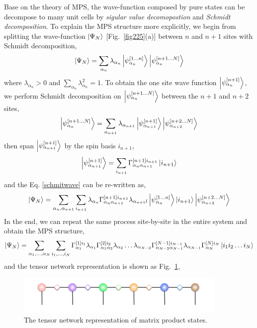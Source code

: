 Base on the theory of MPS, the wave-function composed by pure states can be decompose to many unit cells by \textit{sigular value decomopostion} and \textit{Schmidt decomposition}. To explain the MPS structure more explicitly, we begin from splitting the wave-function $\Ket{\Psi_N}$ [Fig.~\ref{fig225}(a)] between $n$ and $n+1$ sites with Schmidt decomposition, 
\begin{align}
	\label{schmitwave}
	\Ket{\Psi_{N}} = \sum_{\alpha_n} \lambda_{\alpha_n} \Ket{\psi_{\alpha_n}^{[1\dots n]}} \Ket{\psi_{\alpha_n}^{[n+1\dots N]}}
\end{align}
where $\lambda_{\alpha_n} > 0$ and $\sum\limits_{\alpha_n}{\lambda_{\alpha_n}^2 = 1}$. To obtain the one site wave function $\Ket{\psi_{\alpha_n}^{[n+1]}}$, we perform Schmidt decomposition on $\Ket{\psi_{\alpha_n}^{[n+1\dots N]}}$ between the $n+1$ and $n+2$ sites,
\begin{align}
	\Ket{\psi_{\alpha_n}^{[n+1\dots N]}} = \sum_{\alpha_{n+1}} \lambda_{\alpha_{n+1}} \Ket{\psi_{\alpha_{n+1}}^{[n+1]}} \Ket{\psi_{\alpha_{n+2}}^{[n+2\dots N]}}
\end{align}
then span $\Ket{\psi_{\alpha_{n+1}}^{[n+1]}}$ by the spin basis $i_{n+1}$,
\begin{align}
	\Ket{\psi_{\alpha_{n+1}}^{[n+1]}} = \sum_{i_{n+1}}{\Gamma^{[n+1] i_{n+1}}_{\alpha_n \alpha_{n+1}} \Ket{i_{n+1}}}
\end{align}
and the Eq. \ref{schmitwave} can be re-written as, 
\begin{align}
	\Ket{\Psi_{N}} = \sum_{\alpha_n,\alpha_{n+1}}\sum_{i_{n+1}}{\lambda_{\alpha_n} \Gamma^{[n+1] i_{n+1}}_{\alpha_n \alpha_{n+1}} \lambda_{\alpha_{n+1}l} \Ket{\psi_{\alpha_n}^{[1\dots n]}} \Ket{i_{n+1}} \Ket{\psi_{\alpha_{n+2}}^{[n+2\dots N]}} }
\end{align}
In the end, we can repeat the same process site-by-site in the entire system and obtain the MPS structure,
\begin{align}
	\Ket{\Psi_N} = \sum_{\alpha_1,\dots ,\alpha_N}\sum_{i_1,\dots ,i_N}{ \Gamma^{[1] i_{1}}_{\alpha_1} \lambda_{\alpha_1} \Gamma^{[2] i_{2}}_{\alpha_1 \alpha_{2}} \lambda_{\alpha_2} \dots  \lambda_{\alpha_{N-2}} \Gamma^{[N-1] i_{N-1}}_{\alpha_{N-2} \alpha_{N-1}} \lambda_{\alpha_{N-1}} \Gamma^{[N] i_{N}}_{\alpha_{N}} \Ket{i_1 i_2 \dots i_N}}
\end{align}
and the tensor network representation is shown as Fig.~\ref{fig311}, 
\begin{figure}[ht]
	\centering
	\includegraphics[width=0.90\textwidth]{figures/fig3111.png}
	\caption[The tensor network representation of matrix product states]{The tensor network representation of matrix product states.}
	\label{fig311}
\end{figure}

